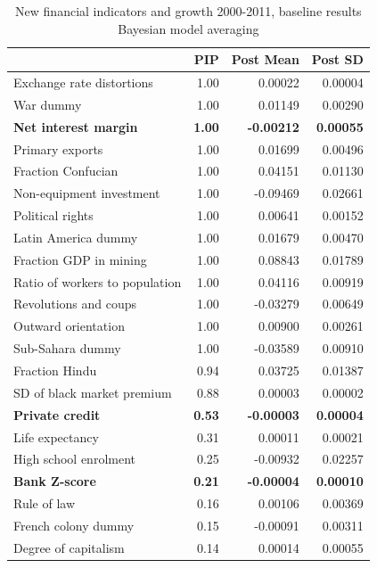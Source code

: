 \begin{refsection}
\begin{table}[!htbp]
	\centering
	\caption{New financial indicators and growth 2000-2011, baseline results\\
		Bayesian model averaging}
		\label{ch2tab:BMAgrowth2000-2011}
	\small
	\begin{tabular}{lrrr}
		\toprule
		& PIP & Post Mean & Post SD \\ 
		\midrule
		  Exchange rate distortions & 1.00 & 0.00022 & 0.00004 \\ 
		  War dummy & 1.00 & 0.01149 & 0.00290 \\ 
		  \textbf{Net interest margin} & \textbf{1.00} & \textbf{-0.00212} & \textbf{0.00055} \\ 
		  Primary exports & 1.00 & 0.01699 & 0.00496 \\ 
		  Fraction Confucian & 1.00 & 0.04151 & 0.01130 \\ 
		  Non-equipment investment & 1.00 & -0.09469 & 0.02661 \\ 
		  Political rights & 1.00 & 0.00641 & 0.00152 \\ 
		  Latin America dummy & 1.00 & 0.01679 & 0.00470 \\ 
		  Fraction GDP in mining & 1.00 & 0.08843 & 0.01789 \\ 
		  Ratio of workers to population & 1.00 & 0.04116 & 0.00919 \\ 
		  Revolutions and coups & 1.00 & -0.03279 & 0.00649 \\ 
		  Outward orientation & 1.00 & 0.00900 & 0.00261 \\ 
		  Sub-Sahara dummy & 1.00 & -0.03589 & 0.00910 \\ 
		  Fraction Hindu & 0.94 & 0.03725 & 0.01387 \\ 
		  SD of black market premium & 0.88 & 0.00003 & 0.00002 \\ 
		  \textbf{Private credit} & \textbf{0.53} & \textbf{-0.00003} & \textbf{0.00004} \\ 
		  Life expectancy & 0.31 & 0.00011 & 0.00021 \\ 
		  High school enrolment & 0.25 & -0.00932 & 0.02257 \\ 
		  \textbf{Bank Z-score} & \textbf{0.21} & \textbf{-0.00004} & \textbf{0.00010} \\ 
		  Rule of law & 0.16 & 0.00106 & 0.00369 \\ 
		  French colony dummy & 0.15 & -0.00091 & 0.00311 \\ 
		  Degree of capitalism & 0.14 & 0.00014 & 0.00055 \\ 

\end{tabular}
\end{table}
\end{refsection}
